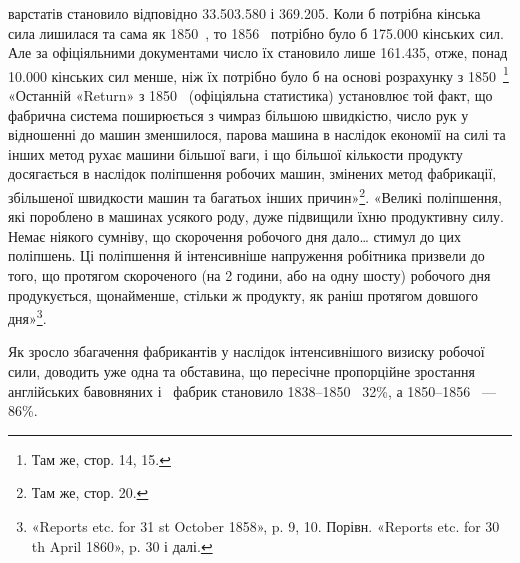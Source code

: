 варстатів становило відповідно \num{33.503.580} і \num{369.205}. Коли б
потрібна кінська сила лишилася та сама як 1850~, то 1856~
потрібно було б \num{175.000} кінських сил. Але за офіціяльними документами
число їх становило лише \num{161.435}, отже, понад \num{10.000}
кінських сил менше, ніж їх потрібно було б на основі розрахунку
з 1850~\footnote{
Там же, стор. 14, 15.
} «Останній «Return» з 1850~ (офіціяльна статистика)
установлює той факт, що фабрична система поширюється з чимраз
більшою швидкістю, число рук у відношенні до машин зменшилося,
парова машина в наслідок економії на силі та інших
метод рухає машини більшої ваги, і що більшої кількости продукту
досягається в наслідок поліпшення робочих машин, змінених
метод фабрикації, збільшеної швидкости машин та багатьох інших
причин»\footnote{
Там же, стор. 20.
}. «Великі поліпшення, які пороблено в машинах
усякого роду, дуже підвищили їхню продуктивну силу. Немає
ніякого сумніву, що скорочення робочого дня дало\dots{} стимул
до цих поліпшень. Ці поліпшення й інтенсивніше напруження
робітника призвели до того, що протягом скороченого (на 2 години,
або на одну шосту) робочого дня продукується, щонайменше,
стільки ж продукту, як раніш протягом довшого дня»\footnote{
«Reports etc. for 31 st October 1858», p. 9, 10. Порівн. «Reports
etc. for 30 th April 1860», p. 30 і далі.
}.

Як зросло збагачення фабрикантів у наслідок інтенсивнішого
визиску робочої сили, доводить уже одна та обставина, що пересічне
пропорційне зростання англійських бавовняних і~
фабрик становило 1838--1850~ 32\%, а 1850--1856~ — 86\%.

